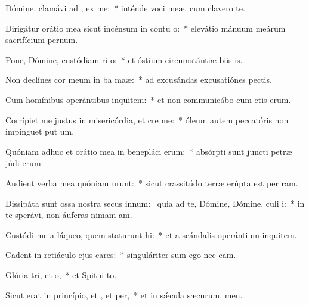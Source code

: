 \item Dómine, clamávi ad , ex me:~* inténde voci meæ, cum clavero  te.
\item Dirigátur orátio mea sicut incénsum in contu o:~* elevátio mánuum meárum sacrifícium pernum.
\item Pone, Dómine, custódiam ri o:~* et óstium circumstántiæ biis is.
\item Non declínes cor meum in ba maæ:~* ad excusándas excusatiónes  pectis.
\item Cum homínibus operántibus inquitem:~* et non communicábo cum etis erum.
\item Corrípiet me justus in misericórdia, et cre me:~* óleum autem peccatóris non impínguet put um.
\item Quóniam adhuc et orátio mea in benepláci erum:~* absórpti sunt juncti petræ júdi erum.
\item Audient verba mea quóniam urunt:~* sicut crassitúdo terræ erúpta est per ram.
\item Dissipáta sunt ossa nostra secus innum:~\pscross{} quia ad te, Dómine, Dómine, culi i:~* in te sperávi, non áuferas nimam am.
\item Custódi me a láqueo, quem staturunt hi:~* et a scándalis operántium inquitem.
\item Cadent in retiáculo ejus cares:~* singuláriter sum ego nec eam.
\item Glória tri, et o,~* et Spitui to.
\item Sicut erat in princípio, et , et per,~* et in sǽcula sæcurum. men.
